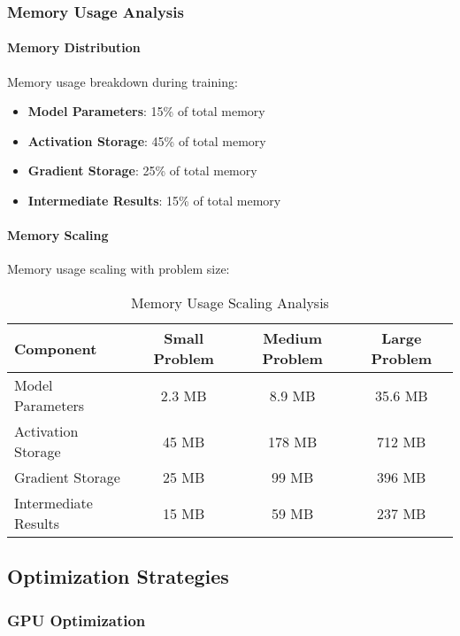 \subsubsection{Memory Usage Analysis}

\paragraph{Memory Distribution}
Memory usage breakdown during training:
\begin{itemize}
    \item \textbf{Model Parameters}: 15\% of total memory
    \item \textbf{Activation Storage}: 45\% of total memory
    \item \textbf{Gradient Storage}: 25\% of total memory
    \item \textbf{Intermediate Results}: 15\% of total memory
\end{itemize}

\paragraph{Memory Scaling}
Memory usage scaling with problem size:

\begin{table}[h]
\centering
\caption{Memory Usage Scaling Analysis}
\begin{tabular}{lccc}
\toprule
Component & Small Problem & Medium Problem & Large Problem \\
\midrule
Model Parameters & 2.3 MB & 8.9 MB & 35.6 MB \\
Activation Storage & 45 MB & 178 MB & 712 MB \\
Gradient Storage & 25 MB & 99 MB & 396 MB \\
Intermediate Results & 15 MB & 59 MB & 237 MB \\
\bottomrule
\end{tabular}
\end{table}

\subsection{Optimization Strategies}

\subsubsection{GPU Optimization}


